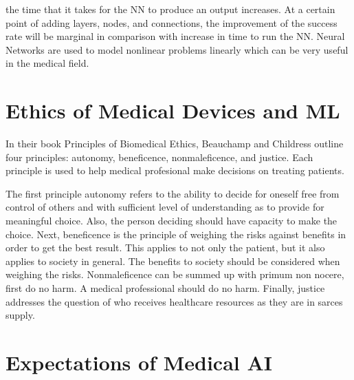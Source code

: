 \documentclass[]{article}
\begin{document}
the time that it takes for the NN to produce an output increases. At a certain point of adding layers, nodes, and connections, the improvement of the success rate will be marginal in comparison with increase in time to run the NN. Neural Networks are used to model nonlinear problems linearly which can be very useful in the medical field.



		

	\section{Ethics of Medical Devices and ML}\label{ethics}

		In their book Principles of Biomedical Ethics, Beauchamp and Childress outline four principles: autonomy, beneficence, nonmaleficence, and justice. Each principle is used to help medical profesional make decisions on treating patients.

		The first principle autonomy refers to the ability to decide for oneself free from control of others and with sufficient level of understanding as to provide for meaningful choice. Also, the person deciding should have capacity to make the choice. Next, beneficence is the principle of weighing the risks against benefits in order to get the best result. This applies to not only the patient, but it also applies to society in general. The benefits to society should be considered when weighing the risks. Nonmaleficence can be summed up with primum non nocere, first do no harm. A medical professional should do no harm. Finally, justice addresses the question of who receives healthcare resources as they are in sarces supply.

	\section{Expectations of Medical AI}
\end{document}
